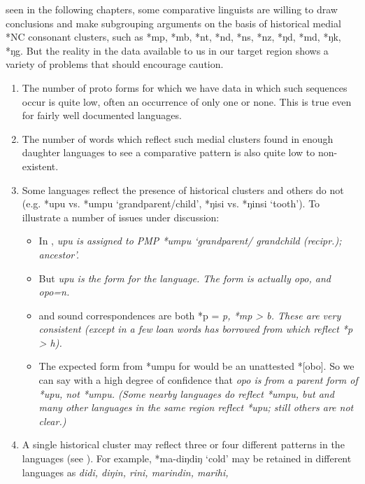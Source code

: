  seen in the following chapters,
some comparative linguists are willing to draw conclusions
and make subgrouping arguments on the basis of historical medial
*NC consonant clusters, such as *mp, *mb,
*nt, *nd, *ns, *nz,
*ŋd, *md, *ŋk, *ŋg.
But the reality in the data available to us in our target region
shows a variety of problems that should encourage caution.

\begin{enumerate}[label=(\alph*)]
	\item	The number of proto forms for which we have data in which
				such sequences occur is quite low,
				often an occurrence of only one or none.
				This is true even for fairly well documented languages.
	\item	The number of words which reflect such medial clusters
				found in enough daughter languages to see a comparative pattern
				is also quite low to non-existent.
	\item	Some languages reflect the presence of historical clusters
				and others do not (e.g. *upu vs.
				*umpu ‘grandparent/child’, *ŋisi vs. *ŋinsi ‘tooth’).
				To illustrate a number of issues under discussion:
		\begin{itemize}
			\item In \citet{BlustTrussel2020},  \it{upu}
						is assigned to PMP *umpu ‘grandparent/ grandchild (recipr.); ancestor’.
			\item But \it{upu} is the form for the  language.
						The  form is actually \it{opo}, and \it{opo=n}.
			\item {}
						and  sound correspondences are both *p = \it{p}, *mp > \it{b}.
						These are very consistent (except in a few loan words 
						has borrowed from  which reflect *p > \it{h}).
			\item The expected form from *umpu for  would be an unattested *[obo].
						So we can say with a high degree of confidence that  \it{opo}
						is from a parent form of *upu, not *umpu.
						(Some nearby languages do reflect *umpu,
						but  and many other languages in the same region reflect
						*upu; still others are not clear.)
		\end{itemize}
	\item	A single historical cluster may reflect three or four different
				patterns in the languages (see \citealp{Grimes1991a}).
				For example, *ma-diŋdiŋ ‘cold’ may be retained in different languages
				as \it{didi, diŋin, rini, marindin, marihi,
}
\end{enumerate}
